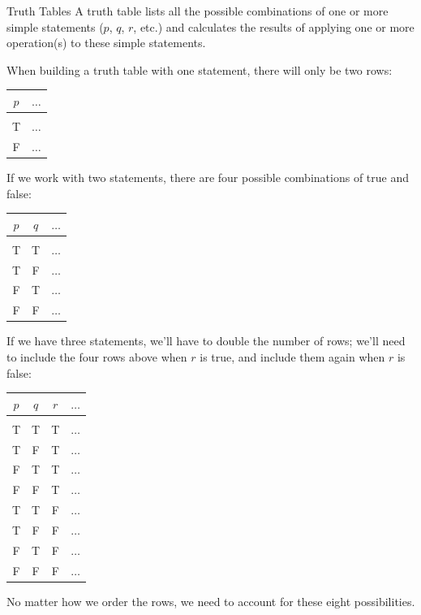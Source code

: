 \begin{proc}{Truth Tables}
A truth table lists all the possible combinations of one or more simple statements ($p$, $q$, $r$, etc.) and calculates the results of applying one or more operation(s) to these simple statements.
\end{proc}
\pagebreak

When building a truth table with one statement, there will only be two rows:
\begin{center}
\begin{tabular}{|c c|}
\hline
$p$ & $\ldots$\\
\hline
& \\
T & $\ldots$\\
F & $\ldots$\\
\hline
\end{tabular}
\end{center}

If we work with two statements, there are four possible combinations of true and false:
\begin{center}
\begin{tabular}{|c c c|}
\hline
$p$ & $q$ & $\ldots$\\
\hline
& & \\
T & T & $\ldots$\\
T & F & $\ldots$\\
F & T & $\ldots$\\
F & F & $\ldots$\\
\hline
\end{tabular}
\end{center}

If we have three statements, we'll have to double the number of rows; we'll need to include the four rows above when $r$ is true, and include them again when $r$ is false:
\begin{center}
\begin{tabular}{|c c c c|}
\hline
$p$ & $q$ & $r$ & $\ldots$\\
\hline
& & &\\
T & T & T & $\ldots$\\
T & F & T & $\ldots$\\
F & T & T & $\ldots$\\
F & F & T & $\ldots$\\
T & T & F & $\ldots$\\
T & F & F & $\ldots$\\
F & T & F & $\ldots$\\
F & F & F & $\ldots$\\
\hline
\end{tabular}
\end{center}
No matter how we order the rows, we need to account for these eight possibilities.\\


